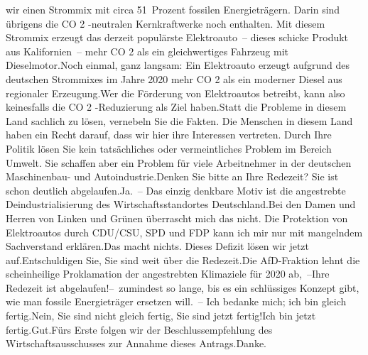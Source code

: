 \documentclass{article}
\begin{document}
wir einen Strommix mit circa 51 Prozent fossilen Energieträgern. Darin sind übrigens die CO 2 -neutralen Kernkraftwerke noch enthalten. Mit diesem Strommix erzeugt das derzeit populärste Elektroauto – dieses schicke Produkt aus Kalifornien – mehr CO 2 als ein gleichwertiges Fahrzeug mit Dieselmotor.Noch einmal, ganz langsam: Ein Elektroauto erzeugt aufgrund des deutschen Strommixes im Jahre 2020 mehr CO 2 als ein moderner Diesel aus regionaler Erzeugung.Wer die Förderung von Elektroautos betreibt, kann also keinesfalls die CO 2 -Reduzierung als Ziel haben.Statt die Probleme in diesem Land sachlich zu lösen, vernebeln Sie die Fakten. Die Menschen in diesem Land haben ein Recht darauf, dass wir hier ihre Interessen vertreten. Durch Ihre Politik lösen Sie kein tatsächliches oder vermeintliches Problem im Bereich Umwelt. Sie schaffen aber ein Problem für viele Arbeitnehmer in der deutschen Maschinenbau- und Autoindustrie.Denken Sie bitte an Ihre Redezeit? Sie ist schon deutlich abgelaufen.Ja. – Das einzig denkbare Motiv ist die angestrebte Deindustrialisierung des Wirtschaftsstandortes Deutschland.Bei den Damen und Herren von Linken und Grünen überrascht mich das nicht. Die Protektion von Elektroautos durch CDU/CSU, SPD und FDP kann ich mir nur mit mangelndem Sachverstand erklären.Das macht nichts. Dieses Defizit lösen wir jetzt auf.Entschuldigen Sie, Sie sind weit über die Redezeit.Die AfD-Fraktion lehnt die scheinheilige Proklamation der angestrebten Klimaziele für 2020 ab, –Ihre Redezeit ist abgelaufen!– zumindest so lange, bis es ein schlüssiges Konzept gibt, wie man fossile Energieträger ersetzen will. – Ich bedanke mich; ich bin gleich fertig.Nein, Sie sind nicht gleich fertig, Sie sind jetzt fertig!Ich bin jetzt fertig.Gut.Fürs Erste folgen wir der Beschlussempfehlung des Wirtschaftsausschusses zur Annahme dieses Antrags.Danke.
\end{document}
